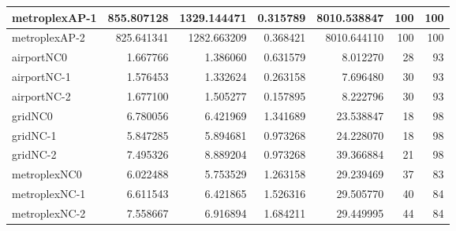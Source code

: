 \begin{longtable}{|l|r|r|r|r|r|r|}
metroplexAP-1 & 855.807128 & 1329.144471 & 0.315789 & 8010.538847 & 100 & 100 \\ \hline
metroplexAP-2 & 825.641341 & 1282.663209 & 0.368421 & 8010.644110 & 100 & 100 \\ \hline
airportNC0 & 1.667766 & 1.386060 & 0.631579 & 8.012270 & 28 & 93 \\ \hline
airportNC-1 & 1.576453 & 1.332624 & 0.263158 & 7.696480 & 30 & 93 \\ \hline
airportNC-2 & 1.677100 & 1.505277 & 0.157895 & 8.222796 & 30 & 93 \\ \hline
gridNC0 & 6.780056 & 6.421969 & 1.341689 & 23.538847 & 18 & 98 \\ \hline
gridNC-1 & 5.847285 & 5.894681 & 0.973268 & 24.228070 & 18 & 98 \\ \hline
gridNC-2 & 7.495326 & 8.889204 & 0.973268 & 39.366884 & 21 & 98 \\ \hline
metroplexNC0 & 6.022488 & 5.753529 & 1.263158 & 29.239469 & 37 & 83 \\ \hline
metroplexNC-1 & 6.611543 & 6.421865 & 1.526316 & 29.505770 & 40 & 84 \\ \hline
metroplexNC-2 & 7.558667 & 6.916894 & 1.684211 & 29.449995 & 44 & 84 \\ \hline
\end{longtable}
